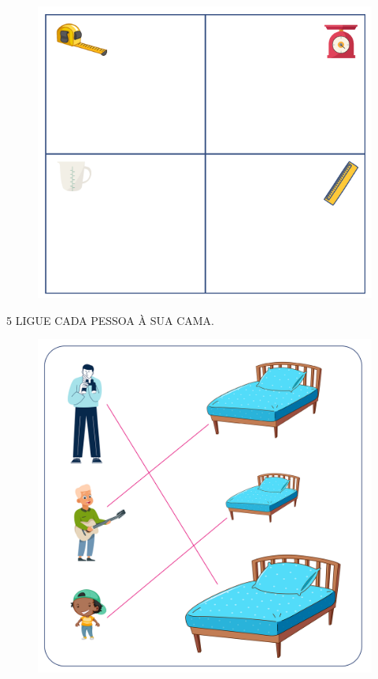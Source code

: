\begin{figure}[H]
\centering
\includegraphics[width=.63\textwidth]{./media/SAEB_1ANO_MAT_FIGURA37.png}
\end{figure}

\num{5} LIGUE CADA PESSOA À SUA CAMA.


\begin{figure}[H]
\centering
\includegraphics[width=.63\textwidth]{./media/SAEB_1ANO_MAT_FIGURA38.png}
\end{figure}

